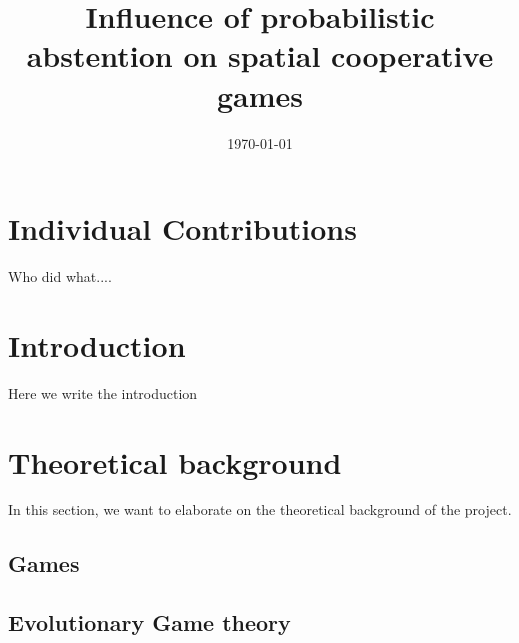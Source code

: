 \documentclass[12pt,oneside,a4paper,fleqn]{article}
\title{Influence of probabilistic abstention on spatial cooperative games}
\date{\today}
\begin{document}
\maketitle 							%

\tableofcontents
\newpage




\pagestyle{fancy}               	%
\setlength{\parindent}{20pt}

\section*{Individual Contributions}
\label{chap:indv}

Who did what....

\newpage
{}
\section*{Introduction}
\label{chap:intro}


Here we write the introduction


\section{Theoretical background}
In this section, we want to elaborate on the theoretical background of the project.
\subsection{Games}

\subsection{Evolutionary Game theory}
\end{document}
